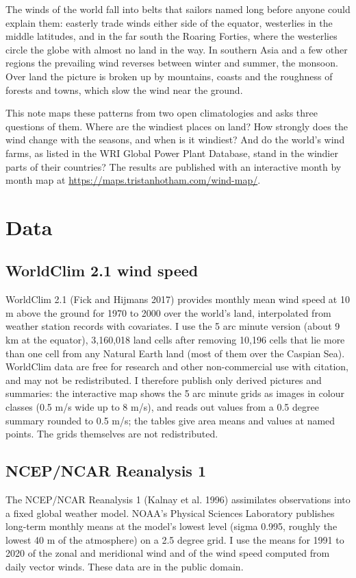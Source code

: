 \documentclass[11pt,a4paper]{article}
\begin{document}
The winds of the world fall into belts that sailors named long before anyone could explain them: easterly trade winds either side of the equator, westerlies in the middle latitudes, and in the far south the Roaring Forties, where the westerlies circle the globe with almost no land in the way. In southern Asia and a few other regions the prevailing wind reverses between winter and summer, the monsoon. Over land the picture is broken up by mountains, coasts and the roughness of forests and towns, which slow the wind near the ground.

This note maps these patterns from two open climatologies and asks three questions of them. Where are the windiest places on land? How strongly does the wind change with the seasons, and when is it windiest? And do the world's wind farms, as listed in the WRI Global Power Plant Database, stand in the windier parts of their countries? The results are published with an interactive month by month map at \url{https://maps.tristanhotham.com/wind-map/}.

\section{Data}

\subsection{WorldClim 2.1 wind speed}
WorldClim 2.1 (Fick and Hijmans 2017) provides monthly mean wind speed at 10 m above the ground for 1970 to 2000 over the world's land, interpolated from weather station records with covariates. I use the 5 arc minute version (about 9 km at the equator), 3,160,018 land cells after removing 10,196 cells that lie more than one cell from any Natural Earth land (most of them over the Caspian Sea). WorldClim data are free for research and other non-commercial use with citation, and may not be redistributed. I therefore publish only derived pictures and summaries: the interactive map shows the 5 arc minute grids as images in colour classes (0.5 m/s wide up to 8 m/s), and reads out values from a 0.5 degree summary rounded to 0.5 m/s; the tables give area means and values at named points. The grids themselves are not redistributed.

\subsection{NCEP/NCAR Reanalysis 1}
The NCEP/NCAR Reanalysis 1 (Kalnay et al. 1996) assimilates observations into a fixed global weather model. NOAA's Physical Sciences Laboratory publishes long-term monthly means at the model's lowest level (sigma 0.995, roughly the lowest 40 m of the atmosphere) on a 2.5 degree grid. I use the means for 1991 to 2020 of the zonal and meridional wind and of the wind speed computed from daily vector winds. These data are in the public domain.
\end{document}
